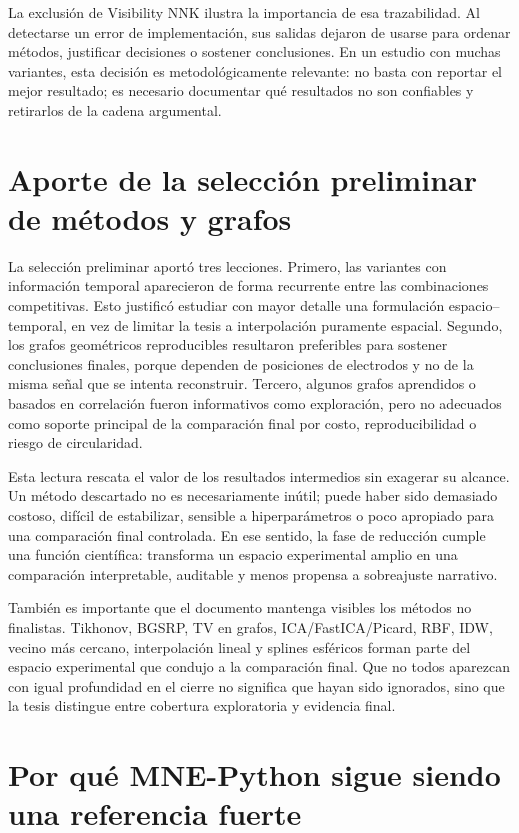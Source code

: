 La exclusión de Visibility NNK ilustra la importancia de esa trazabilidad. Al detectarse un error de implementación, sus salidas dejaron de usarse para ordenar métodos, justificar decisiones o sostener conclusiones. En un estudio con muchas variantes, esta decisión es metodológicamente relevante: no basta con reportar el mejor resultado; es necesario documentar qué resultados no son confiables y retirarlos de la cadena argumental.

\section{Aporte de la selección preliminar de métodos y grafos}

La selección preliminar aportó tres lecciones. Primero, las variantes con información temporal aparecieron de forma recurrente entre las combinaciones competitivas. Esto justificó estudiar con mayor detalle una formulación espacio--temporal, en vez de limitar la tesis a interpolación puramente espacial. Segundo, los grafos geométricos reproducibles resultaron preferibles para sostener conclusiones finales, porque dependen de posiciones de electrodos y no de la misma señal que se intenta reconstruir. Tercero, algunos grafos aprendidos o basados en correlación fueron informativos como exploración, pero no adecuados como soporte principal de la comparación final por costo, reproducibilidad o riesgo de circularidad.

Esta lectura rescata el valor de los resultados intermedios sin exagerar su alcance. Un método descartado no es necesariamente inútil; puede haber sido demasiado costoso, difícil de estabilizar, sensible a hiperparámetros o poco apropiado para una comparación final controlada. En ese sentido, la fase de reducción cumple una función científica: transforma un espacio experimental amplio en una comparación interpretable, auditable y menos propensa a sobreajuste narrativo.

También es importante que el documento mantenga visibles los métodos no finalistas. Tikhonov, BGSRP, TV en grafos, ICA/FastICA/Picard, RBF, IDW, vecino más cercano, interpolación lineal y splines esféricos forman parte del espacio experimental que condujo a la comparación final. Que no todos aparezcan con igual profundidad en el cierre no significa que hayan sido ignorados, sino que la tesis distingue entre cobertura exploratoria y evidencia final.

\section{Por qué MNE-Python sigue siendo una referencia fuerte}

